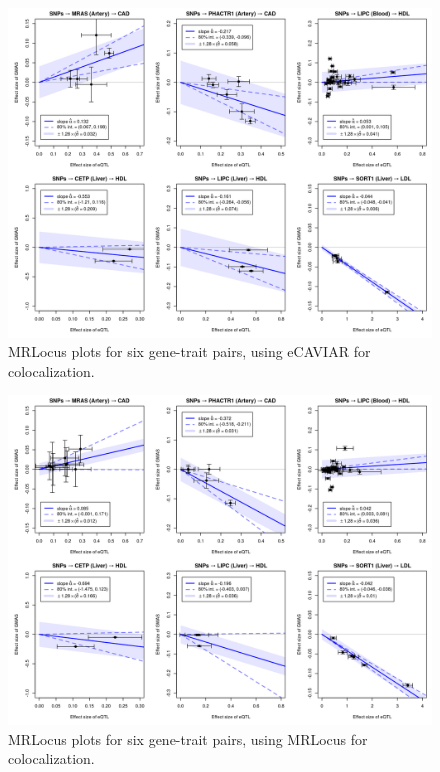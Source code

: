 \documentclass[11pt]{article}
\begin{document}
\begin{figure}[!ht]
  \centering
  \includegraphics[width=\textwidth]{figs/real_loci_ecav-mrlocus.png}
  \caption{MRLocus plots for six gene-trait pairs, using eCAVIAR for colocalization.}
\end{figure}

\begin{figure}[!ht]
  \centering
  \includegraphics[width=\textwidth]{figs/real_loci_mrlocus.png}
  \caption{MRLocus plots for six gene-trait pairs, using MRLocus for colocalization.}
\end{figure}
\end{document}
